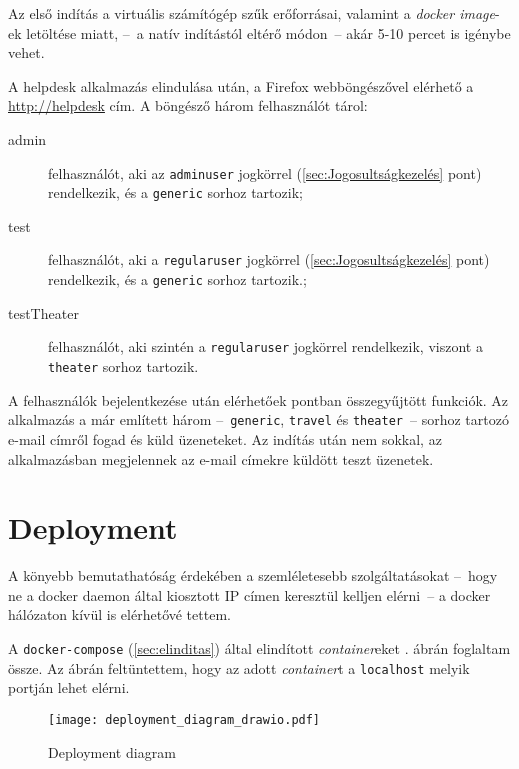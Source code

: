 Az első indítás a virtuális számítógép szűk erőforrásai, valamint a \emph{docker image}-ek letöltése miatt, --~a natív indítástól eltérő módon~-- akár 5-10 percet is igénybe vehet.

A helpdesk alkalmazás elindulása után, a Firefox webböngészővel elérhető a \href{http://helpdesk}{http://helpdesk} cím. A böngésző három felhasználót tárol:
\begin{description}
	\item[admin] felhasználót, aki az \texttt{admin\textunderscore user} jogkörrel (\ref{sec:Jogosultságkezelés} pont) rendelkezik, és a \texttt{generic} sorhoz tartozik;
	\item[test] felhasználót, aki a \texttt{regular\textunderscore user} jogkörrel (\ref{sec:Jogosultságkezelés} pont) rendelkezik, és a \texttt{generic} sorhoz tartozik.;
	\item[testTheater] felhasználót, aki szintén a \texttt{regular\textunderscore user} jogkörrel rendelkezik, viszont a \texttt{theater} sorhoz tartozik.
\end{description}
 
A felhasználók bejelentkezése után elérhetőek  pontban összegyűjtött funkciók. Az alkalmazás a már említett három --~\texttt{generic}, \texttt{travel} és \texttt{theater}~-- sorhoz tartozó e-mail címről fogad és küld üzeneteket. Az indítás után nem sokkal, az alkalmazásban megjelennek az e-mail címekre küldött teszt üzenetek.



\section{Deployment}
A könyebb bemutathatóság érdekében a szemléletesebb szolgáltatásokat --~hogy ne a docker daemon által kiosztott IP címen keresztül kelljen elérni~--   a docker hálózaton kívül is elérhetővé tettem. 

A \texttt{docker-compose} (\ref{sec:elinditas}) által elindított \emph{container}eket . ábrán foglaltam össze. Az ábrán feltüntettem, hogy az adott \emph{container}t a \texttt{localhost} melyik portján lehet elérni.


\begin{figure}[hbt] 
	\centering
	\texttt{[image: deployment\_diagram\_drawio.pdf]}
	\caption[Deployment diagram]{Deployment diagram}
	\label{fig:deployment_diagram}
\end{figure}



